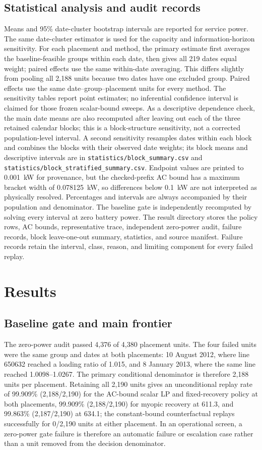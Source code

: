 \documentclass[11pt]{article}
\begin{document}
\subsection{Statistical analysis and audit records}
Means and 95\% date-cluster bootstrap intervals are reported for service power. The same date-cluster estimator is used for the capacity and information-horizon sensitivity. For each placement and method, the primary estimate first averages the baseline-feasible groups within each date, then gives all 219 dates equal weight; paired effects use the same within-date averaging. This differs slightly from pooling all 2,188 units because two dates have one excluded group. Paired effects use the same date--group--placement units for every method. The sensitivity tables report point estimates; no inferential confidence interval is claimed for those frozen scalar-bound sweeps. As a descriptive dependence check, the main date means are also recomputed after leaving out each of the three retained calendar blocks; this is a block-structure sensitivity, not a corrected population-level interval. A second sensitivity resamples dates within each block and combines the blocks with their observed date weights; its block means and descriptive intervals are in \texttt{statistics/block\_summary.csv} and \texttt{statistics/block\_stratified\_summary.csv}. Endpoint values are printed to 0.001~kW for provenance, but the checked-prefix AC bound has a maximum bracket width of 0.078125~kW, so differences below 0.1~kW are not interpreted as physically resolved. Percentages and intervals are always accompanied by their population and denominator. The baseline gate is independently recomputed by solving every interval at zero battery power. The result directory stores the policy rows, AC bounds, representative trace, independent zero-power audit, failure records, block leave-one-out summary, statistics, and source manifest. Failure records retain the interval, class, reason, and limiting component for every failed replay.

\section{Results}
\subsection{Baseline gate and main frontier}
The zero-power audit passed 4,376 of 4,380 placement units. The four failed units were the same group and dates at both placements: 10 August 2012, where line 650632 reached a loading ratio of 1.015, and 8 January 2013, where the same line reached 1.0098--1.0267. The primary conditional denominator is therefore 2,188 units per placement. Retaining all 2,190 units gives an unconditional replay rate of 99.909\% (2,188/2,190) for the AC-bound scalar LP and fixed-recovery policy at both placements, 99.909\% (2,188/2,190) for myopic recovery at 611.3, and 99.863\% (2,187/2,190) at 634.1; the constant-bound counterfactual replays successfully for 0/2,190 units at either placement. In an operational screen, a zero-power gate failure is therefore an automatic failure or escalation case rather than a unit removed from the decision denominator.
\end{document}
